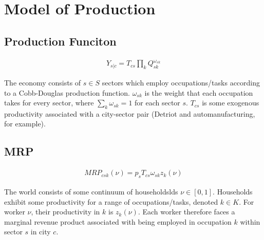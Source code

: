 \documentclass[10pt]{article}
\begin{document}





\section{Model of Production}

\subsection{Production Funciton}

\begin{align}
    Y_{s | c} = T_{cs} \prod_{k} Q_{sk}^{\omega_{sk}}
\end{align}

The economy consists of $s \in S$ sectors which employ occupations/tasks according to a Cobb-Douglas production function. $\omega_{sk}$ is the weight that each occupation takes for every sector, where $\sum_{k}^{} \omega_{sk} = 1$ for each sector $s$. $T_{cs}$ is some exogenous productivity associated with a city-sector pair (Detriot and automanufacturing, for example).

\subsection{MRP}

\begin{align}
    {MRP}_{csk}(\nu) = {p_{s}}{T_{cs}}{\omega_{sk}}{z_{k}(\nu)}
\end{align}

The world consists of some continuum of householdslds $\nu \in [0, 1]$. Households exhibit some productivity for a range of occupations/tasks, denoted $k \in K$. For worker $\nu$, their productivity in $k$ is $z_{k}(\nu)$. Each worker therefore faces a marginal revenue product associated with being employed in occupation $k$ within sector $s$ in city $c$.
\end{document}
